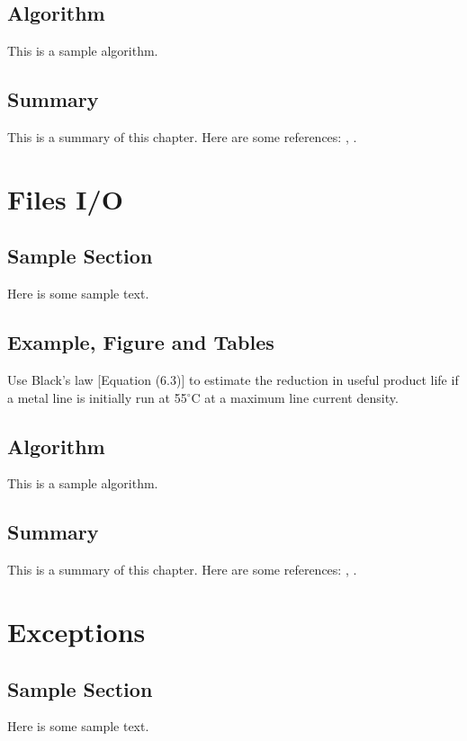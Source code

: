 \documentclass{wileySix}
\begin{document}
\section{Algorithm}
This is a sample algorithm.

\section{Summary}
This is a summary of this chapter.
Here are some references: \cite{xkilby}, \cite{xberen}.

\chapter{Files I/O}

\section{Sample Section}
Here is some sample text.

\section{Example, Figure and Tables}
\vskip6pt
\begin{example}
	Use Black's law [Equation (6.3)] to estimate the reduction in useful product
	life if a metal line is initially run at 55$^\circ$C at a maximum line
	current density.
\end{example}

\section{Algorithm}
This is a sample algorithm.

\section{Summary}
This is a summary of this chapter.
Here are some references: \cite{xkilby}, \cite{xberen}.

\chapter{Exceptions}

\section{Sample Section}
Here is some sample text.
\end{document}
